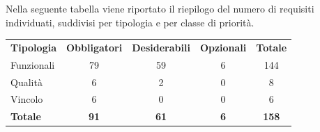 \documentclass[a4paper, 11pt]{article}
\renewcommand{\arraystretch}{1.4} %
\begin{document}
Nella seguente tabella viene riportato il riepilogo del numero di requisiti individuati, suddivisi per tipologia e per classe di priorità.

\renewcommand{\arraystretch}{1.5}
\begin{table}[H]
    \centering
    \begin{tabular}{ l c c c c }
        \rowcolor{AccentDark}
        \color{white}\textbf{Tipologia} & \color{white}\textbf{Obbligatori} & \color{white}\textbf{Desiderabili} & \color{white}\textbf{Opzionali} & \color{white}\textbf{Totale} \\

        Funzionali & 79 & 59 & 6 & 144 \\
        Qualità    & 6  & 2  & 0 & 8  \\
        Vincolo    & 6  & 0  & 0 & 6  \\
        \textbf{Totale} & \textbf{91} & \textbf{61} & \textbf{6} & \textbf{158} \\
    \end{tabular}
    \label{tab:riepilogo-requisiti}
\end{table}
\end{document}
